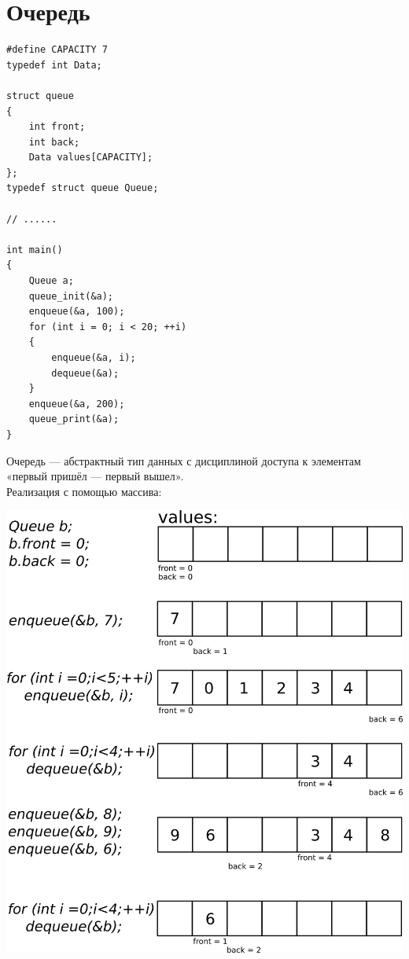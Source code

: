 \documentclass{article}
\begin{document}
\section*{Очередь}
\begin{multicols}{2}
\begin{lstlisting}
#define CAPACITY 7
typedef int Data;

struct queue
{
    int front;
    int back;
    Data values[CAPACITY];
};
typedef struct queue Queue;

// ......

int main()
{
    Queue a;
    queue_init(&a);
    enqueue(&a, 100);
    for (int i = 0; i < 20; ++i)
    {
        enqueue(&a, i);
        dequeue(&a);
    }
    enqueue(&a, 200);
    queue_print(&a);
}
\end{lstlisting}
\vfill\null
Очередь — абстрактный тип данных с дисциплиной доступа к элементам «первый пришёл — первый вышел». \\
Реализация с помощью массива:
\begin{center}
\includegraphics[width=1.05\linewidth]{../images/queue.png}
\end{center}
\end{multicols}
\end{document}
